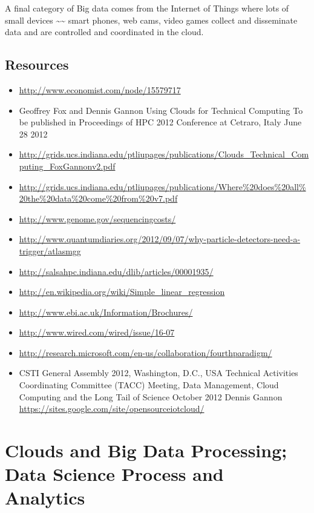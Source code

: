 A final category of Big data comes from the Internet of Things where
lots of small devices \textasciitilde{}\textasciitilde{} smart phones,
web cams, video games collect and disseminate data and are controlled
and coordinated in the cloud.




\subsection{Resources}

\begin{itemize}

\item
  \url{http://www.economist.com/node/15579717}
\item
  Geoffrey Fox and Dennis Gannon Using Clouds for Technical Computing To
  be published in Proceedings of HPC 2012 Conference at Cetraro, Italy
  June 28 2012
\item
  \url{http://grids.ucs.indiana.edu/ptliupages/publications/Clouds_Technical_Computing_FoxGannonv2.pdf}
\item
  \url{http://grids.ucs.indiana.edu/ptliupages/publications/Where\%20does\%20all\%20the\%20data\%20come\%20from\%20v7.pdf}
\item
  \url{http://www.genome.gov/sequencingcosts/}
\item
  \url{http://www.quantumdiaries.org/2012/09/07/why-particle-detectors-need-a-trigger/atlasmgg}
\item
  \url{http://salsahpc.indiana.edu/dlib/articles/00001935/}
\item
  \url{http://en.wikipedia.org/wiki/Simple_linear_regression}
\item
  \url{http://www.ebi.ac.uk/Information/Brochures/}
\item
  \url{http://www.wired.com/wired/issue/16-07}
\item
  \url{http://research.microsoft.com/en-us/collaboration/fourthparadigm/}
\item
  CSTI General Assembly 2012, Washington, D.C., USA Technical Activities
  Coordinating Committee (TACC) Meeting, Data Management, Cloud
  Computing and the Long Tail of Science October 2012 Dennis Gannon
  \url{https://sites.google.com/site/opensourceiotcloud/}
\end{itemize}

\section{Clouds and Big Data Processing; Data Science Process and
Analytics}\label{clouds-and-big-data-processing-data-science-process-and-analytics}

